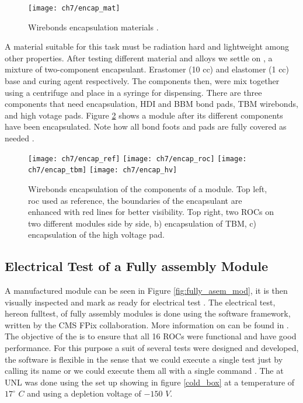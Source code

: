\begin{figure}[!h]
	\centering
	\texttt{[image: ch7/encap\_mat]}
	\caption[Encapsulation materials]{Wirebonds encapsulation materials \cite{ph1_sop}.}
	\label{fig:encapmate}
\end{figure}

A material suitable for this task must be radiation hard and lightweight among other properties. After testing different material and alloys we settle on , a mixture of two-component encapsulant. Erastomer (10 cc) and elastomer (1 cc) base and curing agent respectively. The components then, were mix together using a centrifuge and place in a syringe for dispensing. There are three components that need encapsulation, HDI and BBM bond pads, TBM wirebonds, and high votage pads. Figure \ref{fig:encap} shows a module after its different components have been encapsulated. Note how all bond foots and pads are fully covered as needed \cite{and_the}. 

\begin{figure}[!h]
  \centering
  \texttt{[image: ch7/encap\_ref]}
  \texttt{[image: ch7/encap\_roc]}
  \texttt{[image: ch7/encap\_tbm]}
  \texttt{[image: ch7/encap\_hv]}
  \caption[Encapsulation results]{Wirebonds encapsulation of the components of a module. Top left, roc used as reference, the boundaries of the encapsulant are enhanced with red lines for better visibility. Top right, two ROCs on two different modules side by side, b) encapsulation of TBM, c) encapsulation of the high voltage pad.}\label{fig:encap}
\end{figure}

\subsection{Electrical Test of a Fully assembly Module}
A manufactured module can be seen in Figure \ref{fig:fully_asem_mod}, it is then visually inspected and mark as ready for electrical test {}. 
The electrical test, hereon fulltest, of fully assembly modules is done using the  software framework, written by the CMS FPix collaboration. More information on  can be found in \cite{pxar}. The objective of the  is to ensure that all 16 ROCs were functional and have good performance. For this purpose a suit of several tests were designed and developed, the software is flexible in the sense that we could execute a single test just by calling its name or we could execute them all with a single command . The  at UNL was done using the set up showing in figure \ref{cold_box} at a temperature of $17^{\circ}$ $C$ and using a depletion voltage of $-150$ $V$. {}%

